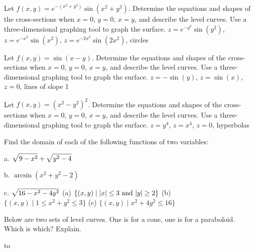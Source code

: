 \exercise Let $f(x,y)=e^{-(x^2+y^2)}\sin(x^2+y^2)$. 
Determine the equations and shapes of the cross-sections when
$x=0$, $y=0$, $x=y$, and describe the level curves.
Use a three-dimensional graphing tool to graph the surface.
\answer $z=e^{-y^2}\sin(y^2)$, $z=e^{-x^2}\sin(x^2)$, 
$z=e^{-2x^2}\sin(2x^2)$, circles
\endanswer
\endexercise

\exercise Let $f(x,y)=\sin(x-y)$. 
Determine the equations and shapes of the cross-sections when
$x=0$, $y=0$, $x=y$, and describe the level curves.
Use a three-dimensional graphing tool to graph the surface.
\answer $z=-\sin(y)$, $z=\sin(x)$, 
$z=0$, lines of slope 1
\endanswer
\endexercise

\exercise Let $f(x,y)=(x^2-y^2)^2$. 
Determine the equations and shapes of the cross-sections when
$x=0$, $y=0$, $x=y$, and describe the level curves.
Use a three-dimensional graphing tool to graph the surface.
\answer $z=y^4$, $z=x^4$, 
$z=0$, hyperbolas
\endanswer

\endexercise

\exercise Find the domain of each of the following functions of two variables:

\beginlist
\item{a.}  $\displaystyle\sqrt{9-x^2}+\sqrt{y^2-4}$
\item{b.}  $\arcsin(x^2+y^2-2)$
\item{c.}  $\displaystyle\sqrt{16-x^2-4y^2}$
\endlist
\answer (a) $\{(x,y)\mid |x|\le3\ \hbox{and}\ |y|\ge2\}$\hfill\break
(b) $\{(x,y)\mid 1\le x^2+y^2\le3\}$\hfill\break
(c) $\{(x,y)\mid x^2+4y^2\le16\}$
\endanswer
\endexercise

\exercise Below are two sets of level curves.  One is for a cone, one
is for a paraboloid.  Which is which? Explain.

\texonly
\nobreak
\hbox to 
\endtexonly
{}
\endexercise

\endexercises


